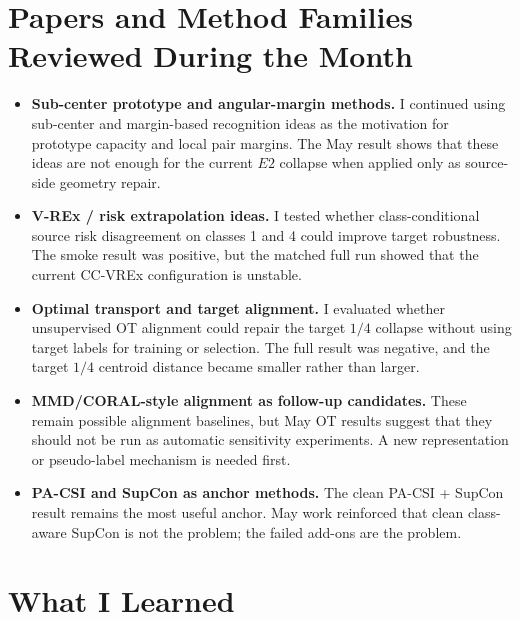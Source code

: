 \documentclass[11pt]{article}
\begin{document}
\section{Papers and Method Families Reviewed During the Month}

\begin{itemize}[leftmargin=*]
    \item \textbf{Sub-center prototype and angular-margin methods.}
    I continued using sub-center and margin-based recognition ideas as the motivation for prototype capacity and local pair margins. The May result shows that these ideas are not enough for the current $E2$ collapse when applied only as source-side geometry repair.

    \item \textbf{V-REx / risk extrapolation ideas.}
    I tested whether class-conditional source risk disagreement on classes 1 and 4 could improve target robustness. The smoke result was positive, but the matched full run showed that the current CC-VREx configuration is unstable.

    \item \textbf{Optimal transport and target alignment.}
    I evaluated whether unsupervised OT alignment could repair the target $1/4$ collapse without using target labels for training or selection. The full result was negative, and the target $1/4$ centroid distance became smaller rather than larger.

    \item \textbf{MMD/CORAL-style alignment as follow-up candidates.}
    These remain possible alignment baselines, but May OT results suggest that they should not be run as automatic sensitivity experiments. A new representation or pseudo-label mechanism is needed first.

    \item \textbf{PA-CSI and SupCon as anchor methods.}
    The clean PA-CSI + SupCon result remains the most useful anchor. May work reinforced that clean class-aware SupCon is not the problem; the failed add-ons are the problem.
\end{itemize}

\section{What I Learned}
\end{document}
